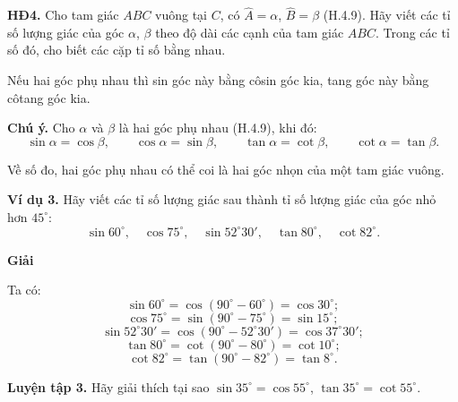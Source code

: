 \begin{lesson}
    \textbf{HĐ4.} Cho tam giác $ABC$ vuông tại $C$, có $\widehat A=\alpha$, $\widehat B=\beta$ (H.4.9). Hãy viết các tỉ số lượng giác của góc $\alpha$, $\beta$ theo độ dài các cạnh của tam giác $ABC$. Trong các tỉ số đó, cho biết các cặp tỉ số bằng nhau.

    \begin{center}
    \end{center}

    \answerline
    \answerline

    \begin{keyconcept}
        Nếu hai góc phụ nhau thì sin góc này bằng côsin góc kia, tang góc này bằng côtang góc kia.
    \end{keyconcept}

    \textbf{Chú ý.} Cho $\alpha$ và $\beta$ là hai góc phụ nhau (H.4.9), khi đó:
    \[
        \sin\alpha=\cos\beta,\qquad
        \cos\alpha=\sin\beta,\qquad
        \tan\alpha=\cot\beta,\qquad
        \cot\alpha=\tan\beta.
    \]

    Về số đo, hai góc phụ nhau có thể coi là hai góc nhọn của một tam giác vuông.

    \textbf{Ví dụ 3.} Hãy viết các tỉ số lượng giác sau thành tỉ số lượng giác của góc nhỏ hơn $45^\circ$:
    \[
        \sin60^\circ,\quad \cos75^\circ,\quad \sin52^\circ30',\quad \tan80^\circ,\quad \cot82^\circ.
    \]

    \textbf{Giải}

    Ta có:
    \[
        \sin60^\circ=\cos(90^\circ-60^\circ)=\cos30^\circ;
    \]
    \[
        \cos75^\circ=\sin(90^\circ-75^\circ)=\sin15^\circ;
    \]
    \[
        \sin52^\circ30'=\cos(90^\circ-52^\circ30')=\cos37^\circ30';
    \]
    \[
        \tan80^\circ=\cot(90^\circ-80^\circ)=\cot10^\circ;
    \]
    \[
        \cot82^\circ=\tan(90^\circ-82^\circ)=\tan8^\circ.
    \]

    \textbf{Luyện tập 3.} Hãy giải thích tại sao $\sin35^\circ=\cos55^\circ$, $\tan35^\circ=\cot55^\circ$.


\end{lesson}
